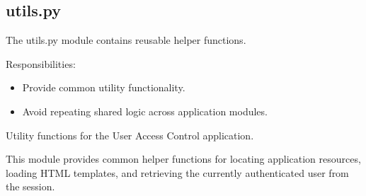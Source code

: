 \documentclass[letterpaper,10pt,english]{sphinxmanual}
\begin{document}
\subsection{utils.py}
\label{\detokenize{modules:utils-py}}
\sphinxAtStartPar
The utils.py module contains reusable helper functions.

\sphinxAtStartPar
Responsibilities:
\begin{itemize}
\item {} 
\sphinxAtStartPar
Provide common utility functionality.

\item {} 
\sphinxAtStartPar
Avoid repeating shared logic across application modules.

\end{itemize}

\sphinxAtStartPar
{}

\begin{sphinxVerbatim}[commandchars=\\\{\}]
 

  
\end{sphinxVerbatim}

\sphinxAtStartPar
{}
\label{\detokenize{modules:module-app.utils}}
\sphinxAtStartPar
Utility functions for the User Access Control application.

\sphinxAtStartPar
This module provides common helper functions for locating application
resources, loading HTML templates, and retrieving the currently
authenticated user from the session.
\end{document}
